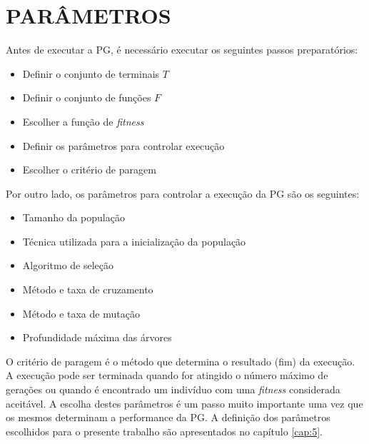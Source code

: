 \section{PARÂMETROS}
\label{sec:2parametros}

Antes de executar a \ac{PG}, é necessário executar os seguintes passos preparatórios:

\begin{itemize}
  \item {Definir o conjunto de terminais $T$}
  \item {Definir o conjunto de funções $F$}
  \item {Escolher a função de \emph{fitness}}
  \item {Definir os parâmetros para controlar execução}
  \item {Escolher o critério de paragem}
\end{itemize}

Por outro lado, os parâmetros para controlar a execução da \ac{PG} são os seguintes:

\begin{itemize}
  \item {Tamanho da população}
  \item {Técnica utilizada para a inicialização da população}
  \item {Algoritmo de seleção}
  \item {Método e taxa de cruzamento}
  \item {Método e taxa de mutação}
  \item {Profundidade máxima das árvores}
\end{itemize}

O critério de paragem é o método que determina o resultado (fim) da execução. A execução pode ser terminada quando for atingido o número máximo de 
gerações ou quando é encontrado um indivíduo com uma \emph{fitness} considerada aceitável. A escolha destes parâmetros é um passo muito importante 
uma vez que os mesmos determinam a performance da \ac{PG}. A definição dos parâmetros escolhidos para o presente trabalho são apresentados no 
capítulo \ref{cap:5}.